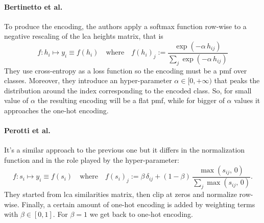 \paragraph{Bertinetto et al.~\cite{MakingBetterMBertin2019}}\label{par:encoding-mbm} To produce the encoding, the authors apply a softmax function row-wise to a negative rescaling of the \acrshort{lca} heights matrix, that is
\begin{equation}
  f : h_i \mapsto y_i \equiv f(h_i)
  \quad \textrm{where} \quad
  f (h_i)_j := \frac{\exp \left({-\alpha \, h_{ij}}\right)}
  {\sum_j \exp\left({-\alpha \, h_{ij}}\right)}
  \label{eq:mbm-hierarchical-encoding}
\end{equation}
They use cross-entropy as a loss function so the encoding must be a \acrshort{pmf} over classes.
Moreover, they introduce an hyper-parameter $\alpha \in [0, +\infty)$ that peaks the distribution around the index corresponding to the encoded class. So, for small value of $\alpha$ the resulting encoding will be a flat \acrshort{pmf}, while for bigger of $\alpha$ values it approaches the one-hot encoding.

\paragraph{Perotti et al.~\cite{BeyondOneHotPerott2023}}\label{par:encoding-b3p} It's a similar approach to the previous one but it differs in the normalization function and in the role played by the hyper-parameter:
\begin{equation}
  f :  s_i \mapsto y_i \equiv f(s_i)
  \quad \textrm{where} \quad
  f (s_i)_j := \beta \, \delta_{ij} +
  \left(1 - \beta \right) \, \frac{\max \left(s_{ij},\,0\right)}
  {\sum_j \max \left(s_{ij},\,0\right)}.
  \label{eq:b3p-hierarchical-encoding}
\end{equation}
They started from \acrshort{lca} similarities matrix, then clip at zeros and normalize row-wise.
Finally, a certain amount of one-hot encoding is added by weighting terms with $\beta \in [0, 1]$. For $\beta = 1$ we get back to one-hot encoding.

